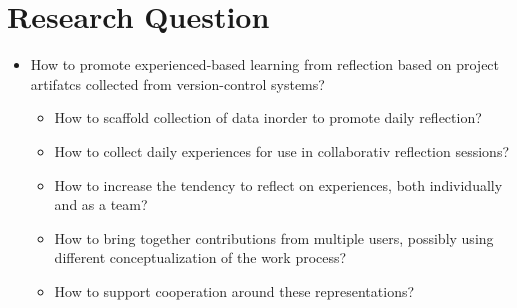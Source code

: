 \section{Research Question}

\begin{itemize}
	\item How to promote experienced-based learning from reflection based on project artifatcs collected from version-control systems?
	\begin{itemize}
		\item How to scaffold collection of data inorder to promote daily reflection?
		\item How to collect daily experiences for use in collaborativ reflection sessions?
		\item How to increase the tendency to reflect on experiences, both individually and as a team? 
		\item How to bring together contributions from multiple users, possibly using different conceptualization of the work process? 
		\item How to support cooperation around these representations?
	\end{itemize}
\end{itemize}